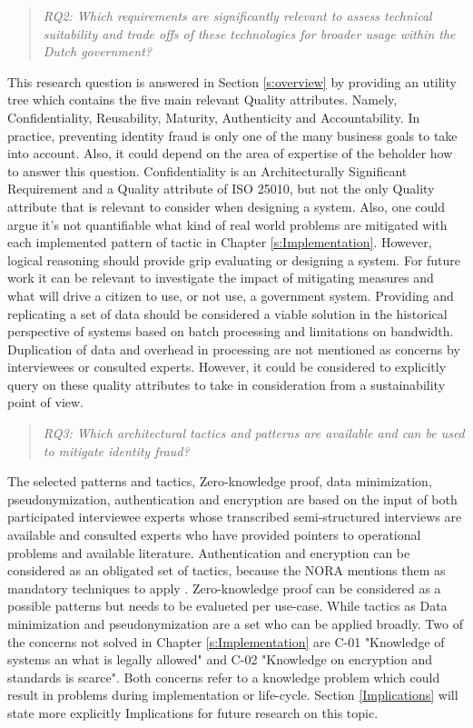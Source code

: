 \begin{quote}\emph{RQ2: Which requirements are significantly relevant to assess technical suitability and trade offs of these technologies for broader usage within the Dutch government?}\end{quote}
This research question is answered in Section \ref{s:overview} by providing an utility tree which contains the five main relevant Quality attributes. Namely, Confidentiality, Reusability, Maturity, Authenticity and Accountability. In practice, preventing identity fraud is only one of the many business goals to take into account. Also, it could depend on the area of expertise of the beholder how to answer this question. Confidentiality is an Architecturally Significant Requirement and a Quality attribute of ISO 25010, but not the only Quality attribute that is relevant to consider when designing a system. Also, one could argue it's not quantifiable what kind of real world problems are mitigated with each implemented pattern of tactic in Chapter \ref{s:Implementation}. However, logical reasoning should provide grip evaluating or designing a system. For future work it can be relevant to investigate the impact of mitigating measures and what will drive a citizen to use, or not use, a government system. Providing and replicating a set of data should be considered a viable solution in the historical perspective of systems based on batch processing and limitations on bandwidth. Duplication of data and overhead in processing are not mentioned as concerns by interviewees or consulted experts. However, it could be considered to explicitly query on these quality attributes to take in consideration from a sustainability point of view.

\begin{quote}\emph{RQ3: Which architectural tactics and patterns are available and can be used to mitigate identity fraud?}\end{quote}
The selected patterns and tactics, Zero-knowledge proof, data minimization, pseudonymization, authentication and encryption are based on the input of both participated interviewee experts whose transcribed semi-structured interviews are available and consulted experts who have provided pointers to operational problems and available literature. Authentication and encryption can be considered as an obligated set of tactics, because the NORA mentions them as mandatory techniques to apply \cite{NORA_PasToeOfLegUit}. Zero-knowledge proof can be considered as a possible patterns but needs to be evalueted per use-case. While tactics as Data minimization and pseudonymization are a set who can be applied broadly. Two of the concerns not solved in Chapter \ref{s:Implementation} are C-01 "Knowledge of systems an what is legally allowed" and C-02 "Knowledge on encryption and standards is scarce". Both concerns refer to a knowledge problem which could result in problems during implementation or life-cycle. Section \ref{Implications} will state more explicitly  Implications for future research on this topic.